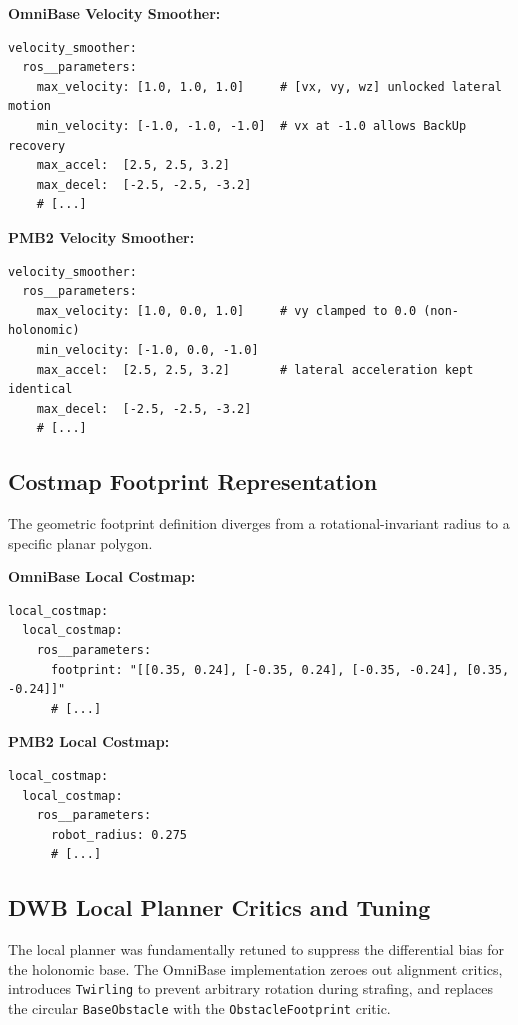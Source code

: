 \textbf{OmniBase Velocity Smoother:}
\begin{lstlisting}[style=myyaml]
velocity_smoother:
  ros__parameters:
    max_velocity: [1.0, 1.0, 1.0]     # [vx, vy, wz] unlocked lateral motion
    min_velocity: [-1.0, -1.0, -1.0]  # vx at -1.0 allows BackUp recovery
    max_accel:  [2.5, 2.5, 3.2]
    max_decel:  [-2.5, -2.5, -3.2]
    # [...]
\end{lstlisting}


\textbf{PMB2 Velocity Smoother:}
\begin{lstlisting}[style=myyaml]
velocity_smoother:
  ros__parameters:
    max_velocity: [1.0, 0.0, 1.0]     # vy clamped to 0.0 (non-holonomic)
    min_velocity: [-1.0, 0.0, -1.0]
    max_accel:  [2.5, 2.5, 3.2]       # lateral acceleration kept identical
    max_decel:  [-2.5, -2.5, -3.2]
    # [...]
\end{lstlisting}

\clearpage
\subsection{Costmap Footprint Representation}
The geometric footprint definition diverges from a rotational-invariant radius to a specific planar polygon.
\vspace{0.3cm}

\textbf{OmniBase Local Costmap:}
\begin{lstlisting}[style=myyaml]
local_costmap:
  local_costmap:
    ros__parameters:
      footprint: "[[0.35, 0.24], [-0.35, 0.24], [-0.35, -0.24], [0.35, -0.24]]"
      # [...]
\end{lstlisting}

\textbf{PMB2 Local Costmap:}
\begin{lstlisting}[style=myyaml]
local_costmap:
  local_costmap:
    ros__parameters:
      robot_radius: 0.275
      # [...]
\end{lstlisting}

\subsection{DWB Local Planner Critics and Tuning}
\label{app:dwb_tuning}

The local planner was fundamentally retuned to suppress the differential bias for the holonomic base. The OmniBase implementation zeroes out alignment critics, introduces \texttt{Twirling} to prevent arbitrary rotation during strafing, and replaces the circular \texttt{BaseObstacle} with the \texttt{ObstacleFootprint} critic.
\vspace{0.3cm}


